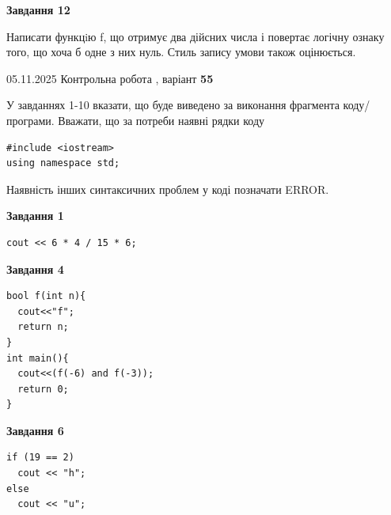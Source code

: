 \documentclass[12pt, ukrainian]{article}
\begin{document}
{\begin {large}
\begin{minipage}[t]{11.0cm}
\begin{center}
\textbf{Завдання 12}
\end{center}

Написати функцiю f, що отримує два дійсних числа і повертає логічну ознаку того, що хоча б одне з них нуль. Стиль запису умови також оцінюється.\par

\end{minipage}

\end {large}}
\newpage

{\Large{05.11.2025 Контрольна робота , варіант  \No \textbf { 55 }\par}}
{
\begin {large}
У завданнях 1-10 вказати, що буде виведено за виконання фрагмента коду/про\-гра\-ми.
Вважати, що за потреби наявні рядки коду
\begin{verbatim}
#include <iostream>
using namespace std;
\end{verbatim}
Наявність інших синтаксичних проблем у коді позначати ERROR.

\begin{minipage}[t]{7.0cm}

\begin{center}
\textbf{Завдання 1}
\end{center}
\vspace{-8mm}

\begin{verbatim}
cout << 6 * 4 / 15 * 6;
\end{verbatim}



\begin{center}
\textbf{Завдання 4}
\end{center}
\vspace{-8mm}

\begin{verbatim}
bool f(int n){
  cout<<"f";
  return n;
}
int main(){
  cout<<(f(-6) and f(-3));
  return 0;
}
\end{verbatim}



\begin{center}
\textbf{Завдання 6}
\end{center}
\vspace{-8mm}

\begin{verbatim}
if (19 == 2)
  cout << "h";
else
  cout << "u";
\end{verbatim}




\end{minipage}
\end{large}}
\end{document}
